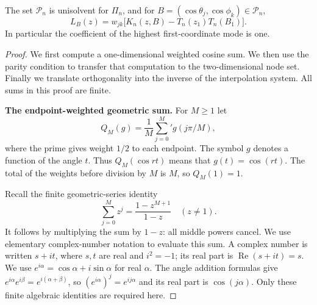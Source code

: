 \begin{lemma}\label{lem:cardinal-kernel}
The set $\mathcal P_n$ is unisolvent for $\Pi_n$, and for
$B=(\cos\theta_j,\cos\phi_k)\in\mathcal P_n$,
\begin{equation}\label{eq:cardinal-kernel}
 L_B(z)=w_{jk}\bigl[K_n(z,B)-T_n(z_1)T_n(B_1)\bigr].
\end{equation}
In particular the coefficient of the highest first-coordinate mode is
one.
\end{lemma}
\begin{proof}
We first compute a one-dimensional weighted cosine sum. We then use
the parity condition to transfer that computation to the two-dimensional
node set. Finally we translate orthogonality into the inverse of the
interpolation system. All sums in this proof are finite.

\noindent\textbf{The endpoint-weighted geometric sum.}
For $M\geq1$ let
\[
 Q_M(g)=\frac1M\sum_{j=0}^M{}'g(j\pi/M),
\]
where the prime gives weight $1/2$ to each endpoint. The symbol $g$
denotes a function of the angle $t$. Thus $Q_M(\cos rt)$ means that
$g(t)=\cos(rt)$. The total of the weights before division by $M$ is
$M$, so $Q_M(1)=1$.

Recall the finite geometric-series identity
\[
 \sum_{j=0}^M z^j=\frac{1-z^{M+1}}{1-z}\quad(z\ne1).
\]
It follows by multiplying the sum by $1-z$: all middle powers cancel.
We use elementary complex-number notation to evaluate this sum.
A complex number is written $s+it$, where $s,t$ are real and $i^2=-1$;
its real part is $\operatorname{Re}(s+it)=s$. We use
$e^{i\alpha}=\cos\alpha+i\sin\alpha$ for real $\alpha$. The angle
addition formulas give $e^{i\alpha}e^{i\beta}=e^{i(\alpha+\beta)}$,
so $(e^{i\alpha})^j=e^{ij\alpha}$ and its real part is
$\cos(j\alpha)$. Only these finite algebraic identities are required
here.


\end{proof}
